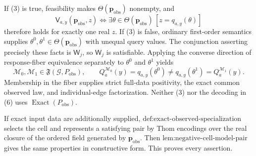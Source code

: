 If (3) is true, feasibility makes \(\Theta(\mathbf p_{\mathrm{obs}})\) nonempty, and
\[
\mathsf V_{a,y}(\mathbf p_{\mathrm{obs}},z)
\Longleftrightarrow
\exists\theta\in\Theta(\mathbf p_{\mathrm{obs}})
\,[z=q_{a,y}(\theta)]
\tag{5}
\]
therefore holds for exactly one real \(z\). If (3) is false, ordinary first-order semantics supplies \(\theta^0,\theta^1\in\Theta(\mathbf p_{\mathrm{obs}})\) with unequal query values. The conjunction asserting precisely these facts is \(\mathsf W_j\), so \(\mathsf W_j\) is satisfiable. Applying the converse direction of response-fiber equivalence separately to \(\theta^0\) and \(\theta^1\) yields
\[
\mathcal M_0,\mathcal M_1\in\mathfrak F(\mathcal G,P_{\mathrm{obs}}),
\qquad
Q_a^{\mathcal M_0}(y)=q_{a,y}(\theta^0)
\neq q_{a,y}(\theta^1)=Q_a^{\mathcal M_1}(y).
\tag{6}
\]
Membership in the fiber supplies strict full-data positivity, the exact common observed law, and individual-edge factorization. Neither (3) nor the decoding in (6) uses \(\operatorname{Exact}(P_{\mathrm{obs}})\).

If exact input data are additionally supplied, \(\text{def:exact-observed-specialization}\) selects the cell and represents a satisfying pair by Thom encodings over the real closure of the ordered field generated by \(\mathbf p_{\mathrm{obs}}\). Then \(\text{lem:negative-cell-model-pair}\) gives the same properties in constructive form. This proves every assertion.
